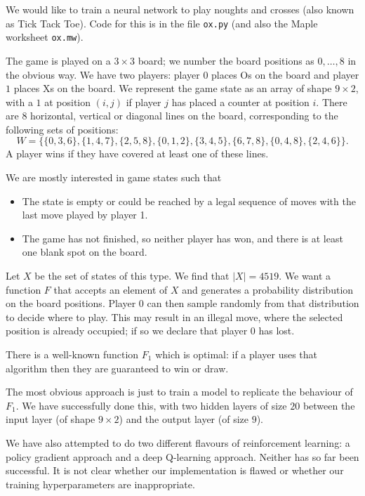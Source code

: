 \documentclass{amsart}
\newcommand{\tm}        {\times}
\renewcommand{\:}{\colon}
\theoremstyle{definition}
\begin{document}
We would like to train a neural network to play noughts and crosses
(also known as Tick Tack Toe).  Code for this is in the file
\texttt{ox.py} (and also the Maple worksheet \texttt{ox.mw}). 

The game is played on a $3\tm 3$ board; we number the board positions
as $0,\dotsc,8$ in the obvious way.  We have two players: player $0$
places Os on the board and player $1$ places Xs on the board.  We
represent the game state as an array of shape $9\tm 2$, with a $1$ at
position $(i,j)$ if player $j$ has placed a counter at position $i$.
There are $8$ horizontal, vertical or diagonal lines on the board,
corresponding to the following sets of positions:
\[ W = \{\{0,3,6\}, \{1,4,7\}, \{2,5,8\}, 
         \{0,1,2\}, \{3,4,5\}, \{6,7,8\},
         \{0,4,8\}, \{2,4,6\}\}.
\]
A player wins if they have covered at least one of these lines.

We are mostly interested in game states such that
\begin{itemize}
 \item[(a)] The state is empty or could be reached by a legal sequence
  of moves with the last move played by player 1.
 \item[(b)] The game has not finished, so neither player has won, and
  there is at least one blank spot on the board.
\end{itemize}
Let $X$ be the set of states of this type.  We find that $|X|=4519$.
We want a function $F$ that accepts an element of $X$ and generates a
probability distribution on the board positions.  Player $0$ can then
sample randomly from that distribution to decide where to play.  This
may result in an illegal move, where the selected position is already
occupied; if so we declare that player $0$ has lost.

There is a well-known function $F_1$ which is optimal: if a player
uses that algorithm then they are guaranteed to win or draw.

The most obvious approach is just to train a model to replicate the
behaviour of $F_1$.  We have successfully done this, with two hidden
layers of size $20$ between the input layer (of shape $9\times 2$) and
the output layer (of size $9$).

We have also attempted to do two different flavours of reinforcement
learning: a policy gradient approach and a deep Q-learning approach.
Neither has so far been successful.  It is not clear whether our
implementation is flawed or whether our training hyperparameters are
inappropriate.
\end{document}
